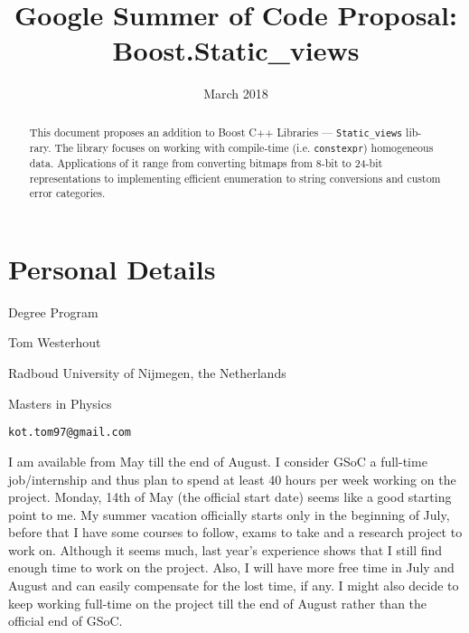 \documentclass[a4paper,12pt]{article}
\title{Google Summer of Code Proposal: Boost.Static\_views}
\date{March 2018}
\begin{document}
\maketitle

\begin{abstract}
    This document proposes an addition to Boost C++ Libraries ---
    \texttt{Static\_views} lib-rary. The library focuses on working with
    compile-time (i.e.  \texttt{constexpr}) homogeneous data. Applications of it
    range from converting bitmaps from 8-bit to 24-bit representations to
    implementing efficient enumeration to string conversions and custom error
    categories.
\end{abstract}

\vspace{5cm}
\section*{Personal Details}
    \begin{labeling}{Degree Program}
    \item [Name] Tom Westerhout
    \item [University] Radboud University of Nijmegen, the Netherlands
    \item [Degree Program] Masters in Physics
    \item [Email] \texttt{kot.tom97@gmail.com}
    \item [Availability] I am available from May till the end of August. I
        consider GSoC a full-time job/internship and thus plan to spend at least
        40 hours per week working on the project. Monday, 14th of May (the
        official start date) seems like a good starting point to me. My summer
        vacation officially starts only in the beginning of July, before that I
        have some courses to follow, exams to take and a research project to
        work on. Although it seems much, last year's experience shows that I
        still find enough time to work on the project. Also, I will have more
        free time in July and August and can easily compensate for the lost
        time, if any. I might also decide to keep working full-time on the
        project till the end of August rather than the official end of GSoC.
    \end{labeling}

\newpage
\end{document}
